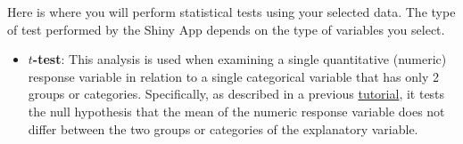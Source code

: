 \documentclass[
]{book}
\begin{document}
Here is where you will perform statistical tests using your selected data. The type of test performed by the Shiny App depends on the type of variables you select.

\begin{itemize}
\item
  \textbf{\(t\)-test}: This analysis is used when examining a single quantitative (numeric) response variable in relation to a single categorical variable that has only 2 groups or categories. Specifically, as described in a previous \href{https://ubco-biology.github.io/BIOL-116-Lab-Manual/which-statistical-test-to-use.html\#comparing-means-among-treatment-groups}{tutorial}, it tests the null hypothesis that the mean of the numeric response variable does not differ between the two groups or categories of the explanatory variable.


\end{itemize}
\end{document}
